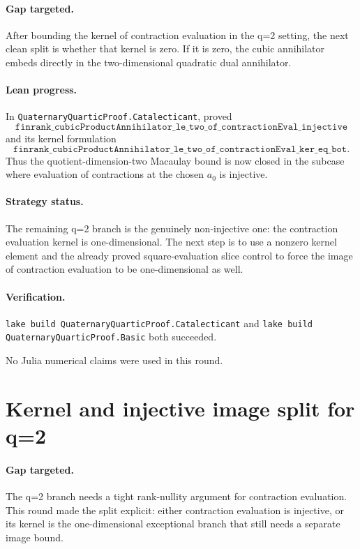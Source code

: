\documentclass[11pt]{article}
\begin{document}
\paragraph{Gap targeted.}
After bounding the kernel of contraction evaluation in the q=2 setting, the
next clean split is whether that kernel is zero.  If it is zero, the cubic
annihilator embeds directly in the two-dimensional quadratic dual
annihilator.

\paragraph{Lean progress.}
In \texttt{QuaternaryQuarticProof.Catalecticant}, proved
\[
\texttt{finrank\_cubicProductAnnihilator\_le\_two\_of\_contractionEval\_injective}
\]
and its kernel formulation
\[
\texttt{finrank\_cubicProductAnnihilator\_le\_two\_of\_contractionEval\_ker\_eq\_bot}.
\]
Thus the quotient-dimension-two Macaulay bound is now closed in the subcase
where evaluation of contractions at the chosen \(a_0\) is injective.

\paragraph{Strategy status.}
The remaining q=2 branch is the genuinely non-injective one: the contraction
evaluation kernel is one-dimensional.  The next step is to use a nonzero
kernel element and the already proved square-evaluation slice control to
force the image of contraction evaluation to be one-dimensional as well.

\paragraph{Verification.}
\texttt{lake build QuaternaryQuarticProof.Catalecticant} and
\texttt{lake build QuaternaryQuarticProof.Basic} both succeeded.

No Julia numerical claims were used in this round.

\section*{Kernel and injective image split for q=2}

\paragraph{Gap targeted.}
The q=2 branch needs a tight rank-nullity argument for contraction
evaluation.  This round made the split explicit: either contraction evaluation
is injective, or its kernel is the one-dimensional exceptional branch that
still needs a separate image bound.
\end{document}
